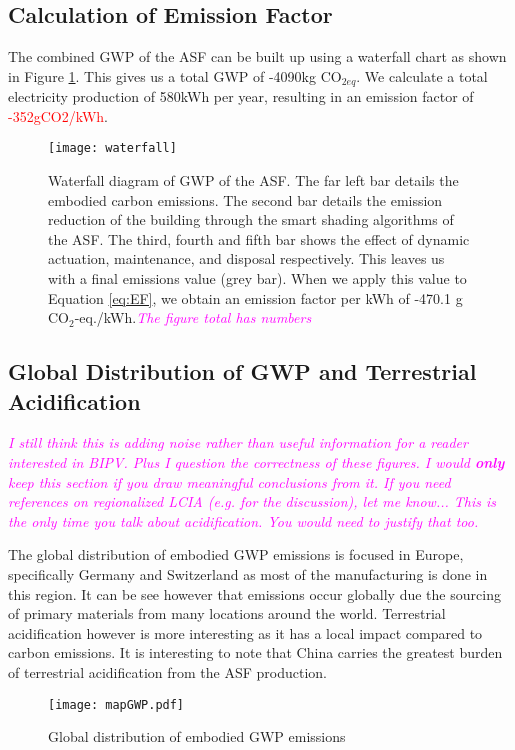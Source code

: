 \subsection{Calculation of Emission Factor}
The combined GWP of the ASF can be built up using a waterfall chart as shown in  Figure \ref{fig:waterfall}. This gives us a total GWP of -4090kg CO$_{2eq}$. We calculate a total electricity production of 580kWh per year, resulting in an emission factor of \textcolor{red}{-352gCO2/kWh}.



\begin{figure}[H]
\begin{center}
\texttt{[image: waterfall]}
\caption{Waterfall diagram of GWP of the ASF. The far left bar details the embodied carbon emissions. The second bar details the emission reduction of the building through the smart shading algorithms of the ASF. The third, fourth and fifth bar shows the effect of dynamic actuation, maintenance, and disposal respectively. This leaves us with a final emissions value (grey bar). When we apply this value to Equation \ref{eq:EF}, we obtain an emission factor per kWh of -470.1 g CO$_2$-eq./kWh.\textcolor{magenta}{\textit{The figure total has numbers}}}
\label{fig:waterfall}
\end{center}
\end{figure}

\subsection{Global Distribution of GWP and Terrestrial Acidification}
\textcolor{magenta}{\textit{I still think this is adding noise rather than useful information for a reader interested in BIPV. Plus I question the correctness of these figures. I would \textbf{only} keep this section if you draw meaningful conclusions from it. If you need references on regionalized LCIA (e.g. for the discussion), let me know... This is the only time you talk about acidification. You would need to justify that too.}}

The global distribution of embodied GWP emissions is focused in Europe, specifically Germany and Switzerland as most of the manufacturing is done in this region. It can be see however that emissions occur globally due the sourcing of primary materials from many locations around the world. Terrestrial acidification however is more interesting as it has a local impact compared to carbon emissions. It is interesting to note that China carries the greatest burden of terrestrial acidification from the ASF production. 
\begin{figure}[H]
\begin{center}
\texttt{[image: mapGWP.pdf]}
\caption{Global distribution of embodied GWP emissions}
\label{fig:mapGWP}
\end{center}
\end{figure}

